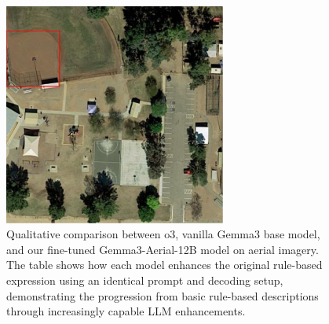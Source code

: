 \begin{figure}[t]
\centering
\begin{minipage}{0.5\textwidth}
\centering
\includegraphics[width=0.65\textwidth]{./images/3llm.png}
\end{minipage}%
\begin{minipage}{0.5\textwidth}
\centering
\hspace{-1cm}
\end{minipage}
\caption{Qualitative comparison between o3, vanilla Gemma3 base model, and our fine-tuned Gemma3-Aerial-12B model on aerial imagery. The table shows how each model enhances the original rule-based expression using an identical prompt and decoding setup, demonstrating the progression from basic rule-based descriptions through increasingly capable LLM enhancements.}
\label{fig:distillation_comparison}
\end{figure}


